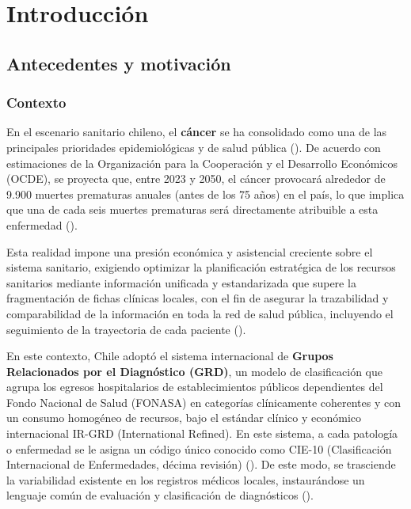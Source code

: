 \chapter{Introducci\'on}
\label{cap:introduccion}

\section{Antecedentes y motivaci\'on}
\label{intro:antecentes_y_motivacion}

\subsection{Contexto}
\label{intro:contexto}

En el escenario sanitario chileno, el \textbf{cáncer} se ha consolidado como una de las principales prioridades epidemiológicas y de salud pública (\cite{oecd2024, uc2025}). De acuerdo con estimaciones de la Organización para la Cooperación y el Desarrollo Económicos (OCDE), se proyecta que, entre 2023 y 2050, el cáncer provocará alrededor de 9.900 muertes prematuras anuales (antes de los 75 años) en el país, lo que implica que una de cada seis muertes prematuras será directamente atribuible a esta enfermedad (\cite{oecd2024}).

Esta realidad impone una presión económica y asistencial creciente sobre el sistema sanitario, exigiendo optimizar la planificación estratégica de los recursos sanitarios mediante información unificada y estandarizada que supere la fragmentación de fichas clínicas locales, con el fin de asegurar la trazabilidad y comparabilidad de la información en toda la red de salud pública, incluyendo el seguimiento de la trayectoria de cada paciente (\cite{minsal2023norma}).

En este contexto, Chile adoptó el sistema internacional de \textbf{Grupos Relacionados por el Diagnóstico (GRD)}, un modelo de clasificación que agrupa los egresos hospitalarios de establecimientos públicos dependientes del Fondo Nacional de Salud (FONASA) en categorías clínicamente coherentes y con un consumo homogéneo de recursos, bajo el estándar clínico y económico internacional IR-GRD (International Refined). En este sistema, a cada patología o enfermedad se le asigna un código único conocido como CIE-10 (Clasificación Internacional de Enfermedades, décima revisión) (\cite{Metamodelo2024}). De este modo, se trasciende la variabilidad existente en los registros médicos locales, instaurándose un lenguaje común de evaluación y clasificación de diagnósticos (\cite{Sigesa2019}).

